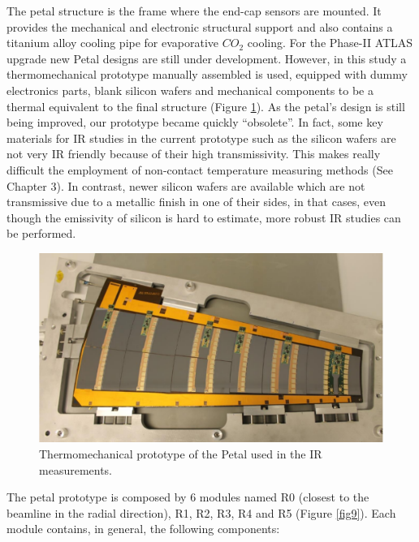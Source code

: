 		The petal structure is the frame where the end-cap sensors are mounted. It provides the mechanical and electronic structural support and also contains a titanium alloy cooling pipe for evaporative $CO_{2}$ cooling. For the Phase-II ATLAS upgrade new Petal designs are still under development. However, in this study a thermomechanical prototype manually assembled is used, equipped with dummy electronics parts, blank silicon wafers and mechanical components to be a thermal equivalent to the final structure (Figure \ref{fig8}). As the petal's design is still being improved, our prototype became quickly “obsolete”. In fact, some key materials for IR studies in the current prototype such as the silicon wafers are not very IR friendly because of their high transmissivity. This makes really difficult the employment of non-contact temperature measuring methods (See Chapter 3). In contrast, newer silicon wafers are available which are not transmissive due to a metallic finish in one of their sides, in that cases, even though the emissivity of silicon is hard to estimate, more robust IR studies can be performed.
		
		\begin{figure}[ht!]
			\centering
			\captionsetup{justification=centering,margin=2cm}
			\includegraphics[scale=0.35]{Figures/Chapter02/PetalConstruction.pdf}
			\caption{\label{fig8} Thermomechanical prototype of the Petal used in the IR measurements.}
		\end{figure}
		
		The petal prototype is composed by 6 modules named R0 (closest to the beamline in the radial direction), R1, R2, R3, R4 and R5 (Figure \ref{fig9}). Each module contains, in general, the following components:
		
